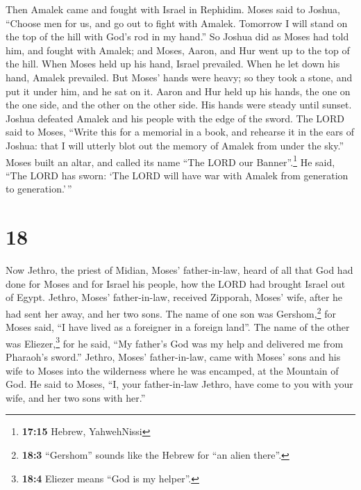  Then Amalek came and fought with Israel in Rephidim.
 Moses said to Joshua, ``Choose men for us, and go out to
fight with Amalek. Tomorrow I will stand on the top of the hill with
God's rod in my hand.''  So Joshua did as Moses had told
him, and fought with Amalek; and Moses, Aaron, and Hur went up to the
top of the hill.  When Moses held up his hand, Israel
prevailed. When he let down his hand, Amalek prevailed. 
But Moses' hands were heavy; so they took a stone, and put it under him,
and he sat on it. Aaron and Hur held up his hands, the one on the one
side, and the other on the other side. His hands were steady until
sunset.  Joshua defeated Amalek and his people with the
edge of the sword.  The LORD said to Moses, ``Write this
for a memorial in a book, and rehearse it in the ears of Joshua: that I
will utterly blot out the memory of Amalek from under the sky.''
 Moses built an altar, and called its name ``The LORD our
Banner''.\footnote{\textbf{17:15} Hebrew, YahwehNissi} 
He said, ``The LORD has sworn: `The LORD will have war with Amalek from
generation to generation.'\,''

\hypertarget{section-17}{%
\section{18}\label{section-17}}

 Now Jethro, the priest of Midian, Moses' father-in-law,
heard of all that God had done for Moses and for Israel his people, how
the LORD had brought Israel out of Egypt.  Jethro, Moses'
father-in-law, received Zipporah, Moses' wife, after he had sent her
away,  and her two sons. The name of one son was
Gershom,\footnote{\textbf{18:3} ``Gershom'' sounds like the Hebrew for
  ``an alien there''.} for Moses said, ``I have lived as a foreigner in
a foreign land''.  The name of the other was
Eliezer,\footnote{\textbf{18:4} Eliezer means ``God is my helper''.} for
he said, ``My father's God was my help and delivered me from Pharaoh's
sword.''  Jethro, Moses' father-in-law, came with Moses'
sons and his wife to Moses into the wilderness where he was encamped, at
the Mountain of God.  He said to Moses, ``I, your
father-in-law Jethro, have come to you with your wife, and her two sons
with her.''

